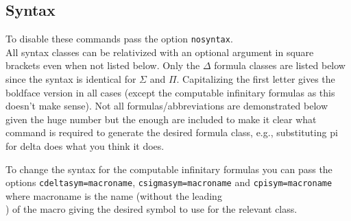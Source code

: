 \documentclass[leqno,11pt]{amsart}
\begin{document}
\subsection{Syntax}
To disable these commands pass the option \verb=nosyntax=.\\  All syntax classes can be relativized with an optional argument in square brackets even when not listed below.  Only the \( \Delta \) formula classes are listed below since the syntax is identical for \( \Sigma \) and \( \Pi \).  Capitalizing the first letter gives the boldface version in all cases (except the computable infinitary formulas as this doesn't make sense).  Not all formulas/abbreviations are demonstrated below given the huge number but the enough are included to make it clear what command is required to generate the desired formula class, e.g., substituting pi for delta does what you think it does.

To change the syntax for the computable infinitary formulas you can pass the options \verb!cdeltasym=macroname!, \verb!csigmasym=macroname! and \verb!cpisym=macroname! where macroname is the name (without the leading \\) of the macro giving the desired symbol to use for the relevant class. 
\end{document}
